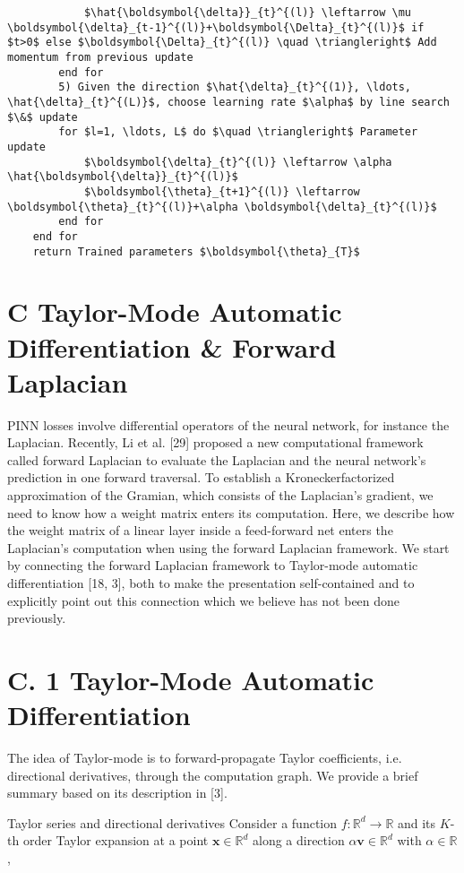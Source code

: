 \documentclass[10pt]{article}
\begin{document}
\begin{verbatim}
            $\hat{\boldsymbol{\delta}}_{t}^{(l)} \leftarrow \mu \boldsymbol{\delta}_{t-1}^{(l)}+\boldsymbol{\Delta}_{t}^{(l)}$ if $t>0$ else $\boldsymbol{\Delta}_{t}^{(l)} \quad \triangleright$ Add momentum from previous update
        end for
        5) Given the direction $\hat{\delta}_{t}^{(1)}, \ldots, \hat{\delta}_{t}^{(L)}$, choose learning rate $\alpha$ by line search $\&$ update
        for $l=1, \ldots, L$ do $\quad \triangleright$ Parameter update
            $\boldsymbol{\delta}_{t}^{(l)} \leftarrow \alpha \hat{\boldsymbol{\delta}}_{t}^{(l)}$
            $\boldsymbol{\theta}_{t+1}^{(l)} \leftarrow \boldsymbol{\theta}_{t}^{(l)}+\alpha \boldsymbol{\delta}_{t}^{(l)}$
        end for
    end for
    return Trained parameters $\boldsymbol{\theta}_{T}$
\end{verbatim}

\section*{C Taylor-Mode Automatic Differentiation \& Forward Laplacian}
PINN losses involve differential operators of the neural network, for instance the Laplacian. Recently, Li et al. [29] proposed a new computational framework called forward Laplacian to evaluate the Laplacian and the neural network's prediction in one forward traversal. To establish a Kroneckerfactorized approximation of the Gramian, which consists of the Laplacian's gradient, we need to know how a weight matrix enters its computation. Here, we describe how the weight matrix of a linear layer inside a feed-forward net enters the Laplacian's computation when using the forward Laplacian framework. We start by connecting the forward Laplacian framework to Taylor-mode automatic differentiation [18, 3], both to make the presentation self-contained and to explicitly point out this connection which we believe has not been done previously.

\section*{C. 1 Taylor-Mode Automatic Differentiation}
The idea of Taylor-mode is to forward-propagate Taylor coefficients, i.e. directional derivatives, through the computation graph. We provide a brief summary based on its description in [3].

Taylor series and directional derivatives Consider a function $f: \mathbb{R}^{d} \rightarrow \mathbb{R}$ and its $K$-th order Taylor expansion at a point $\boldsymbol{x} \in \mathbb{R}^{d}$ along a direction $\alpha \boldsymbol{v} \in \mathbb{R}^{d}$ with $\alpha \in \mathbb{R}$,
\end{document}
